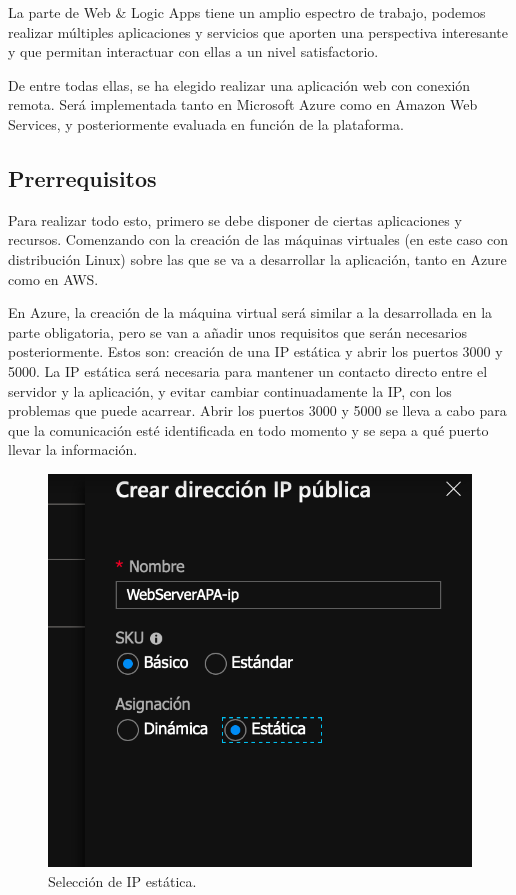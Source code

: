 \documentclass[english,runningheads,a4paper]{llncs}[2018/03/10]
\begin{document}
La parte de Web \& Logic Apps tiene un amplio espectro de trabajo, podemos realizar
múltiples aplicaciones y servicios que aporten una perspectiva interesante y que
permitan interactuar con ellas a un nivel satisfactorio.

De entre todas ellas, se ha elegido realizar una aplicación web con conexión remota.
Será implementada tanto en Microsoft Azure como en Amazon Web Services, y
posteriormente evaluada en función de la plataforma.

\subsection{Prerrequisitos}

Para realizar todo esto, primero se debe disponer de ciertas aplicaciones y
recursos. Comenzando con la creación de las máquinas virtuales (en este caso con
distribución Linux) sobre las que se va a desarrollar la aplicación, tanto en Azure
como en AWS.

En Azure, la creación de la máquina virtual será similar a la desarrollada en la
parte obligatoria, pero se van a añadir unos requisitos que serán necesarios
posteriormente. Estos son: creación de una IP estática y abrir los puertos 3000 y
5000. La IP estática será necesaria para mantener un contacto directo entre el
servidor y la aplicación, y evitar cambiar continuadamente la IP, con los problemas
que puede acarrear. Abrir los puertos 3000 y 5000 se lleva a cabo para que la
comunicación esté identificada en todo momento y se sepa a qué puerto llevar la
información.

\begin{figure}[h!]
 \includegraphics[width=\linewidth]{./Web/Azure/Azure1.png}
 \caption{Selección de IP estática.}
\end{figure}
\end{document}
